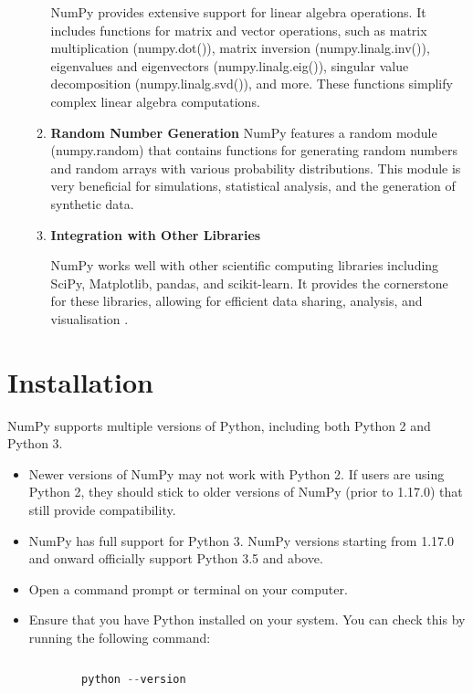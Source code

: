 \begin{enumerate}
\begin{enumerate}
		NumPy provides extensive support for linear algebra operations. It includes functions for matrix and vector operations, such as matrix multiplication (numpy.dot()), matrix inversion (numpy.linalg.inv()), eigenvalues and eigenvectors (numpy.linalg.eig()), singular value decomposition (numpy.linalg.svd()), and more. These functions simplify complex linear algebra computations.
		
		\item \textbf{Random Number Generation}
		NumPy features a random module (numpy.random) that contains functions for generating random numbers and random arrays with various probability distributions. This module is very beneficial for simulations, statistical analysis, and the generation of synthetic data.
		
		
		\item \textbf{Integration with Other Libraries}
		
		NumPy works well with other scientific computing libraries including SciPy, Matplotlib, pandas, and scikit-learn. It provides the cornerstone for these libraries, allowing for efficient data sharing, analysis, and visualisation \cite{oliphant2006}.
		
	\end{enumerate}
	
\end{enumerate}

\section{Installation}

NumPy supports multiple versions of Python, including both Python 2 and Python 3.

\begin{itemize}
	
	\item Newer versions of NumPy  may not work with Python 2. If users are using Python 2, they should stick to older versions of NumPy (prior to 1.17.0) that still provide compatibility.
	
	\item NumPy has full support for Python 3. NumPy versions starting from 1.17.0 and onward officially support Python 3.5 and above. 
	
	\item Open a command prompt or terminal on your computer.
	
	\item Ensure that you have Python installed on your system. You can check this by running the following command:
	
	\begin{lstlisting}[language=Python]
		
		python --version
	\end{lstlisting}
	
\end{itemize}

